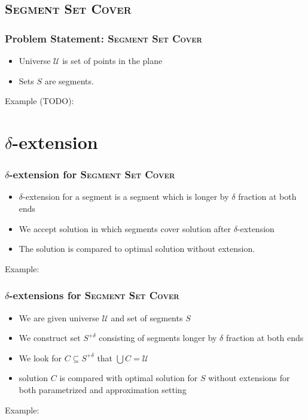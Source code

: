 \documentclass{beamer}
\begin{document}
\subsection{\textsc{Segment Set Cover}}

\begin{frame}
\frametitle{Problem Statement: \textsc{Segment Set Cover}}
\begin{itemize}
\item Universe $\mathcal{U}$ is set of points in the plane
\item Sets $S$ are segments.
\end{itemize}

Example (TODO):




\end{frame}

\section{$\delta$-extension}
\begin{frame}
\frametitle{$\delta$-extension for \textsc{Segment Set Cover}}
\begin{itemize}
\item $\delta$-extension for a segment is a segment which is longer by
$\delta$ fraction at both ends
\item We accept solution in which segments cover solution after
$\delta$-extension
\item The solution is compared to optimal solution without extension.
\end{itemize}

Example:


\end{frame}

\begin{frame}
\frametitle{$\delta$-extensions for \textsc{Segment Set Cover}}
\begin{itemize}
\item We are given universe $\mathcal{U}$ and set of segments $S$
\item We construct set $S^{+\delta}$ consisting of  
segments longer by $\delta$ fraction at both ends
\item We look for $C \subseteq S^{+\delta}$ that $\bigcup C = \mathcal{U}$
\item solution $C$ is compared with optimal solution for $S$ without extensions
for both parametrized and approximation setting
\end{itemize}

Example:


\end{frame}
\end{document}
